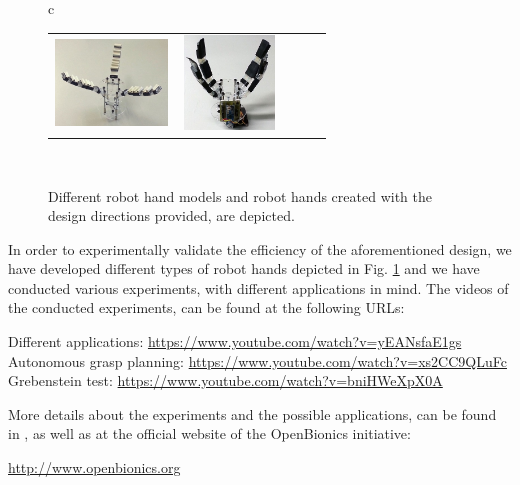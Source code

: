 \begin{figure}[ht!]
\begin{center}
\begin{tabular}{ c }
\begin{tabular}{ c  c  c  c  c }
	\includegraphics[height=2.5cm,width=3cm]{figures/Intro/RealRobotHand_3Fingered3Phalanges.jpg}&
	\includegraphics[height=2.5cm,width=2.5cm]{figures/Intro/RealRobotHand_4Fingered2Phalanges.jpg}\\
\end{tabular} \\
\end{tabular}
\end{center}
\caption{Different robot hand models and robot hands created with the design directions provided, are depicted. } 
\label{RobotHands}
\end{figure}

In order to experimentally validate the efficiency of the aforementioned design, we have developed different types of robot hands depicted in Fig. \ref{RobotHands} and we have conducted various experiments, with different applications in mind. The videos of the conducted experiments, can be found at the following URLs:

\begin{center}
Different applications:
{\url{https://www.youtube.com/watch?v=yEANsfaE1gs}}\\
Autonomous grasp planning:
{\url{https://www.youtube.com/watch?v=xs2CC9QLuFc}}\\
Grebenstein test:
{\url{https://www.youtube.com/watch?v=bniHWeXpX0A}}\\
\end{center}

More details about the experiments and the possible applications, can be found in \cite{Zisimatos2014IROS}, as well as at the official website of the OpenBionics initiative:

\begin{center}
{\url{http://www.openbionics.org}}
\end{center} 

\newpage
